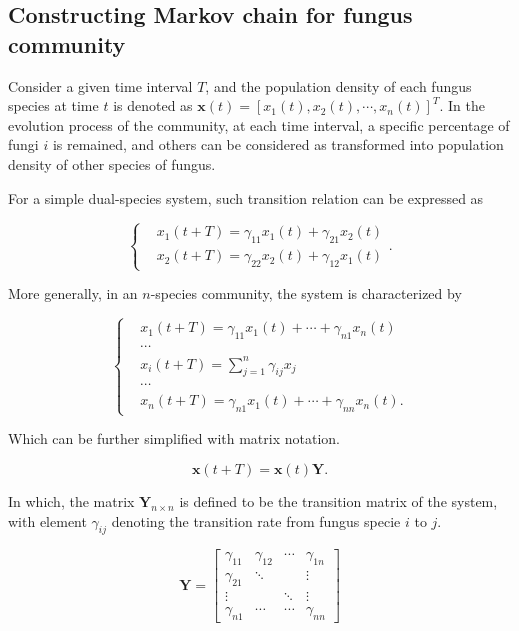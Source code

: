 \subsection{Constructing Markov chain for fungus community}

Consider a given time interval $T$, and the population density of each fungus species at time $t$ is denoted as $\boldsymbol{x}(t) = [x_1(t), x_2(t), \cdots, x_n(t)]^T$. In the evolution process of the community, at each time interval, a specific percentage of fungi $i$ is remained, and others can be considered as transformed into population density of other species of fungus.

For a simple dual-species system, such transition relation can be expressed as

\begin{equation}
    \left\{\begin{aligned} &
        x_1(t+T) = \gamma_{11}x_1(t) + \gamma_{21}x_2(t) \\ &
        x_2(t+T) = \gamma_{22}x_2(t) + \gamma_{12}x_1(t)
    \end{aligned}\right..
\end{equation}

More generally, in an $n$-species community, the system is characterized by

\begin{equation}
    \left\{\begin{aligned} &
        x_1(t+T) = \gamma_{11}x_1(t) + \cdots + \gamma_{n1}x_n(t) \\ & \cdots \\ &
        x_i(t+T) = \sum_{j=1}^n \gamma_{ij}x_j \\ & \cdots \\ &
        x_n(t+T) = \gamma_{n1}x_1(t) + \cdots + \gamma_{nn}x_n(t).
    \end{aligned}\right.
\end{equation}

Which can be further simplified with matrix notation.

\begin{equation}\label{eq:trans}
    \boldsymbol{x}(t+T) = \boldsymbol{x}(t)\boldsymbol{Y}.
\end{equation}

In which, the matrix $\boldsymbol{Y}_{n\times n}$ is defined to be the transition matrix of the system, with element $\gamma_{ij}$ denoting the transition rate from fungus specie $i$ to $j$.

\begin{equation}
    \boldsymbol{Y} =
    \begin{bmatrix}
        \gamma_{11} & \gamma_{12} & \cdots & \gamma_{1n} \\
        \gamma_{21} & \ddots & & \vdots \\
        \vdots & & \ddots & \vdots \\
        \gamma_{n1} & \cdots & \cdots & \gamma_{nn}
    \end{bmatrix}
\end{equation}

